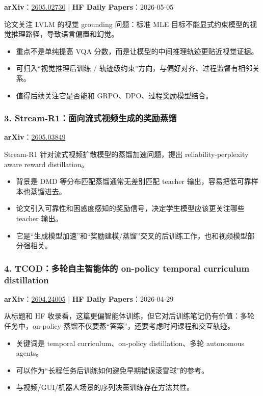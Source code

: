 \textbf{arXiv}：\href{https://arxiv.org/abs/2605.02730}{2605.02730} | \textbf{HF Daily Papers}：2026-05-05

论文关注 LVLM 的视觉 grounding 问题：标准 MLE 目标不能显式约束模型的视觉推理路径，导致语言偏置和幻觉。

\begin{itemize}[leftmargin=1.5em]
  \item 重点不是单纯提高 VQA 分数，而是让模型的中间推理轨迹更贴近视觉证据。
  \item 可归入“视觉推理后训练 / 轨迹级约束”方向，与偏好对齐、过程监督有相邻关系。
  \item 值得后续关注它是否能和 GRPO、DPO、过程奖励模型结合。
\end{itemize}

\subsubsection{3. Stream-R1：面向流式视频生成的奖励蒸馏}

\textbf{arXiv}：\href{https://arxiv.org/abs/2605.03849}{2605.03849}

Stream-R1 针对流式视频扩散模型的蒸馏加速问题，提出 reliability-perplexity aware reward distillation。

\begin{itemize}[leftmargin=1.5em]
  \item 背景是 DMD 等分布匹配蒸馏通常无差别匹配 teacher 输出，容易把低可靠样本也蒸馏进去。
  \item 论文引入可靠性和困惑度感知的奖励信号，决定学生模型应该更关注哪些 teacher 输出。
  \item 它是“生成模型加速”和“奖励建模/蒸馏”交叉的后训练工作，也和视频模型部分强相关。
\end{itemize}

\subsubsection{4. TCOD：多轮自主智能体的 on-policy temporal curriculum distillation}

\textbf{arXiv}：\href{https://arxiv.org/abs/2604.24005}{2604.24005} | \textbf{HF Daily Papers}：2026-04-29

从标题和 HF 收录看，这篇更偏智能体训练，但它对后训练笔记仍有价值：多轮任务中，on-policy 蒸馏不仅要蒸“答案”，还要考虑时间课程和交互轨迹。

\begin{itemize}[leftmargin=1.5em]
  \item 关键词是 temporal curriculum、on-policy distillation、多轮 autonomous agents。
  \item 可以作为“长程任务后训练如何避免早期错误滚雪球”的参考。
  \item 与视频/GUI/机器人场景的序列决策训练存在方法共性。
\end{itemize}

